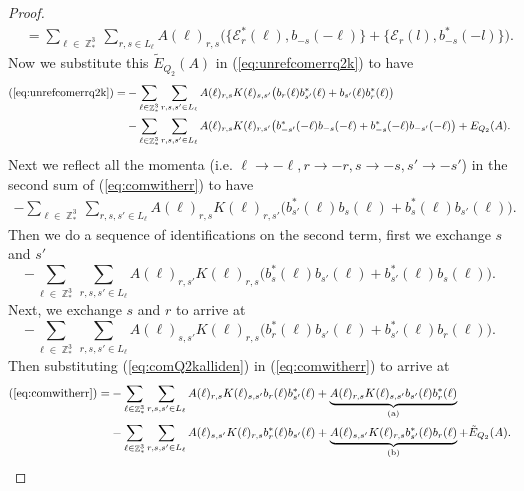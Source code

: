 \documentclass[sn-mathphys, Numbered ,a4paper]{sn-jnl}%
\DeclareMathOperator{\Z}{\mathbb{Z}}
\theoremstyle{plain}
\theoremstyle{definition}
\theoremstyle{remark}
\theoremstyle{plain}
\theoremstyle{definition}
\theoremstyle{remark}
\begin{document}
\begin{proof}
\begin{align}
    &=\sum\limits_{\ell \in \Z^3_*}\sum\limits_{r,s \in L_{\ell}}A(\ell)_{r,s}\Big(\big\{\mathcal{E}^*_{r}(\ell), b_{-s}(-\ell)\big\} + \big\{\mathcal{E}_r(l), b^*_{-s}(-l)\big\}\Big).
\end{align}
Now we substitute this $\tilde E_{Q_2}(A) $ in (\ref{eq:unrefcomerrq2k}) to have
\begin{align}
    (\ref{eq:unrefcomerrq2k})=&-\sum\limits_{\ell \in \Z^3_*}\sum\limits_{r,s,s' \in L_{\ell}}A(\ell)_{r,s}
        K(\ell)_{s,s'}\big(b_{r}(\ell)b^*_{s'}(\ell)+b_{s'}(\ell)b^*_{r}(\ell) \big)\nonumber\\ &-\sum\limits_{\ell \in \Z^3_*}\sum\limits_{r,s,s' \in L_{\ell}}A(\ell)_{r,s} K(\ell)_{r,s'}\big(b^*_{-s'}(-\ell)b_{-s}(-\ell) + b^*_{-s}(-\ell)b_{-s'}(-\ell)\big) + E_{Q_2}(A).\label{eq:comwitherr}
\end{align}
Next we reflect all the momenta (i.e. $\ell\rightarrow -\ell,r\rightarrow -r,s\rightarrow -s,s'\rightarrow -s'$) in the second sum of (\ref{eq:comwitherr}) to have
\begin{align}
   -\sum\limits_{\ell \in \Z^3_*}\sum\limits_{r,s,s' \in L_{\ell}}A(\ell)_{r,s} K(\ell)_{r,s'}\big(b^*_{s'}(\ell)b_{s}(\ell) + b^*_{s}(\ell)b_{s'}(\ell)\big).
\end{align}
Then we do a sequence of identifications on the second term, first we exchange $s$ and $s'$ 
\begin{equation}
   -\sum\limits_{\ell \in \Z^3_*}\sum\limits_{r,s,s' \in L_{\ell}}A(\ell)_{r,s'} K(\ell)_{r,s}\big(b^*_{s}(\ell)b_{s'}(\ell) + b^*_{s'}(\ell)b_{s}(\ell)\big).
\end{equation}
Next, we exchange $s$ and $r$ to arrive at
\begin{equation}\label{eq:comQ2kalliden}
   -\sum\limits_{\ell \in \Z^3_*}\sum\limits_{r,s,s' \in L_{\ell}}A(\ell)_{s,s'} K(\ell)_{r,s}\big(b^*_{r}(\ell)b_{s'}(\ell) + b^*_{s'}(\ell)b_{r}(\ell)\big).
\end{equation}
Then substituting (\ref{eq:comQ2kalliden}) in (\ref{eq:comwitherr}) to arrive at
\begin{align}
    (\ref{eq:comwitherr})=&-\sum\limits_{\ell \in \Z^3_*}\sum\limits_{r,s,s' \in L_{\ell}}A(\ell)_{r,s}
        K(\ell)_{s,s'}b_{r}(\ell)b^*_{s'}(\ell)+\underbrace{A(\ell)_{r,s}
        K(\ell)_{s,s'}b_{s'}(\ell)b^*_{r}(\ell)}_{\text{(a)}}\nonumber\\ &-\sum\limits_{\ell \in \Z^3_*}\sum\limits_{r,s,s' \in L_{\ell}}A(\ell)_{s,s'} K(\ell)_{r,s}b^*_{r}(\ell)b_{s'}(\ell) + \underbrace{A(\ell)_{s,s'}
        K(\ell)_{r,s}b^*_{s'}(\ell)b_{r}(\ell)}_{\text{(b)}} + \tilde E_{Q_2}(A).\label{eq:Q2k_before_anticom}

\end{align}
\end{proof}
\end{document}

